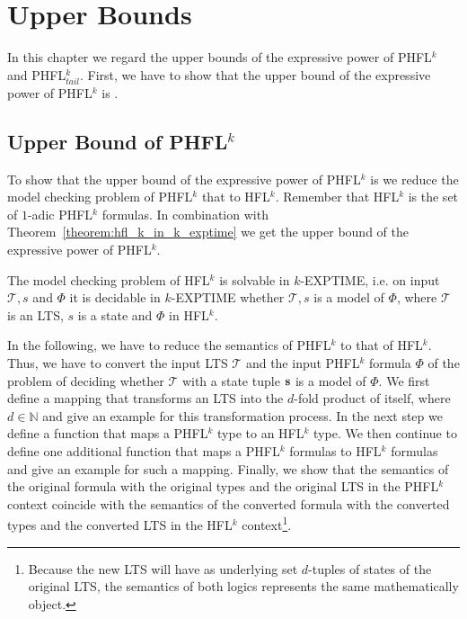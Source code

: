 
\chapter{Upper Bounds}\label{ch:upperBounds}

In this chapter we regard the upper bounds of the expressive power of PHFL$^k$ and PHFL$^k_{tail}$. First, we have to show that the upper
bound of the expressive power of PHFL$^k$ is .

\section{Upper Bound of PHFL$^k$}

To show that the upper bound of the expressive power of PHFL$^k$ is  we reduce the model checking
problem of PHFL$^k$ that to HFL$^k$. Remember that HFL$^k$ is the set of $1$-adic PHFL$^k$
formulas. In combination with Theorem~\ref{theorem:hfl_k_in_k_exptime} we get the upper bound of the expressive power of PHFL$^k$.

\begin{theorem}{\cite{axelsson2007complexity}}
    \label{theorem:hfl_k_in_k_exptime}
	The model checking problem of HFL$^k$ is solvable in $k$-EXPTIME, i.e. on input $\mathcal{T}, s$ and $\Phi$ it is decidable in $k$-EXPTIME whether $\mathcal{T}, s$ is a model of $\Phi$, where $\mathcal{T}$ is an LTS, $s$ is a state and $\Phi$ in HFL$^k$.
\end{theorem}

In the following, we have to reduce the semantics of PHFL$^k$ to that of HFL$^k$.
Thus, we have to convert the input LTS $\mathcal{T}$ and the input PHFL$^k$ formula $\Phi$ of the problem of deciding whether
$\mathcal{T}$ with a state tuple $\emph{s}$ is a model of $\Phi$. We first define a mapping that transforms an LTS into the $d$-fold product of itself, where $d \in \mathbb{N}$
 and give an example for this transformation process. In the next step we define a function that maps a
PHFL$^k$ type to an HFL$^k$ type. We then continue to define one additional function that maps a PHFL$^k$ formulas to
HFL$^k$ formulas and give an example for such a mapping. Finally, we show that the semantics of the original
formula with the original types and the original LTS in the PHFL$^k$ context coincide with the semantics of the
converted formula with the converted types and the converted LTS in the HFL$^k$ context\footnote{Because the new LTS will have as underlying set $d$-tuples of states of the original LTS, the semantics of both logics represents the same mathematically object.}. 

